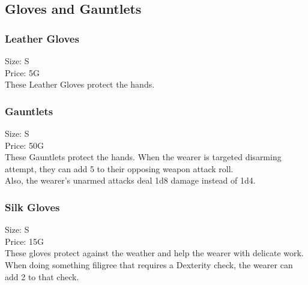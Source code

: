 \subsection{Gloves and Gauntlets}\label{subsec:gloves}

\subsubsection{Leather Gloves}\label{item:leathergloves}
Size: S\\
Price: 5G\\
These Leather Gloves protect the hands.

\subsubsection{Gauntlets}\label{item:gauntlets}
Size: S\\
Price: 50G\\
These Gauntlets protect the hands.
When the wearer is targeted disarming attempt, they can add 5 to their opposing weapon attack roll.\\
Also, the wearer's unarmed attacks deal 1d8 damage instead of 1d4.

\subsubsection{Silk Gloves}\label{item:silkgloves}
Size: S\\
Price: 15G\\
These gloves protect against the weather and help the wearer with delicate work.
When doing something filigree that requires a Dexterity check, the wearer can add 2 to that check.